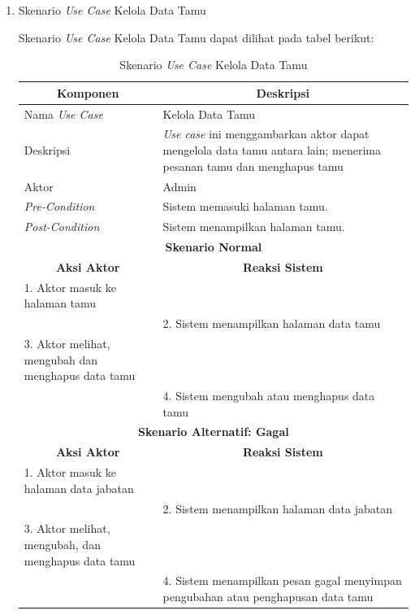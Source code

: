 \begin{enumerate}[label=\alph*.]
        
    \item Skenario \textit{Use Case} Kelola Data Tamu
	\par Skenario \textit{Use Case} Kelola Data Tamu dapat dilihat pada tabel berikut:

    \begin{longtable}{|p{5cm}|p{9cm}|}
	    \caption{Skenario \textit{Use Case} Kelola Data Tamu}
	    \label{tab:my-table} \\ \hline
	    \multicolumn{1}{|c|}{\textbf{Komponen}} & \multicolumn{1}{c|}{\textbf{Deskripsi}} \\ \hline
	    \endfirsthead
	    \endhead
	    Nama \textit{Use Case} & Kelola Data Tamu \\ \hline
	    Deskripsi & \textit{Use case} ini menggambarkan aktor dapat mengelola data tamu antara lain; menerima pesanan tamu dan menghapus tamu \\ \hline
	    Aktor & Admin \\ \hline
	    \textit{Pre-Condition} & Sistem memasuki halaman tamu. \\ \hline
	    \textit{Post-Condition} & Sistem menampilkan halaman tamu. \\ \hline
	    \multicolumn{2}{|c|}{\textbf{Skenario Normal}} \\ \hline
	    \multicolumn{1}{|c|}{\textbf{Aksi Aktor}} & \multicolumn{1}{c|}{\textbf{Reaksi Sistem}} \\ \hline
	    1. Aktor masuk ke halaman tamu & \\ \hline
	    & 2. Sistem menampilkan halaman data tamu \\ \hline
	    3. Aktor melihat, mengubah dan menghapus data tamu & \\ \hline
	    & 4. Sistem mengubah atau menghapus data tamu \\ \hline
	    \multicolumn{2}{|c|}{\textbf{Skenario Alternatif: Gagal}} \\ \hline
	    \multicolumn{1}{|c|}{\textbf{Aksi Aktor}} & \multicolumn{1}{c|}{\textbf{Reaksi Sistem}} \\ \hline
	    1. Aktor masuk ke halaman data jabatan & \\ \hline
	    & 2. Sistem menampilkan halaman data jabatan \\ \hline
	    3. Aktor melihat, mengubah, dan menghapus data tamu & \\ \hline
	    & 4. Sistem menampilkan pesan gagal menyimpan pengubahan atau penghapusan data tamu \\ \hline
	\end{longtable}
     

\end{enumerate}
